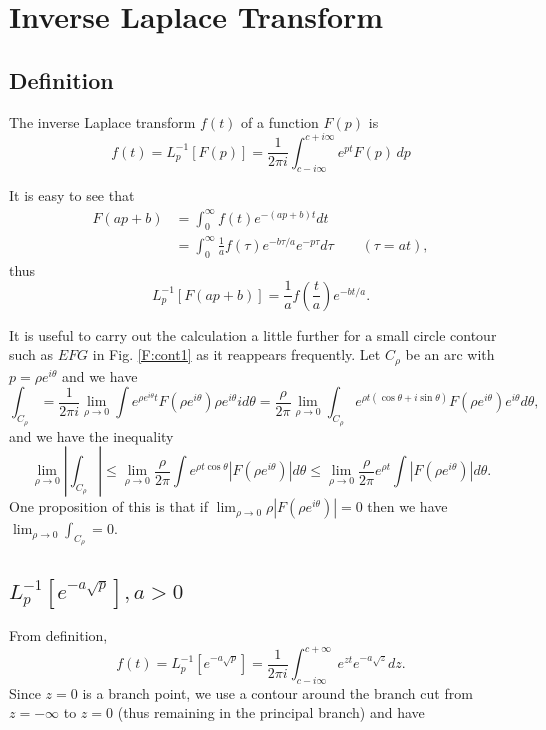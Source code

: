 
\chapter{Inverse Laplace Transform}

\section{Definition}
The inverse Laplace transform $f(t)$ of a function $F(p)$ is
\begin{equation}
	f(t) = L_p^{-1} [ F(p) ] 
       = \frac{1}{2\pi i}   
           \int_{c-i\infty}^{c+i\infty} e^{p t} F(p)\, dp
\end{equation}

It is easy to see that
\begin{align*}
	F(a p+b) 
	&= \int_0^{\infty} f(t) e^{-(a p+b)t} dt  \\
	&= \int_0^{\infty} \frac{1}{a} f\left(\tau\right) e^{-b\tau /a} 
	     e^{-p\tau} d\tau  \qquad (\tau=a t),
\end{align*}
thus
\begin{equation} \label{E:ilt_lin}
	L_p^{-1} [ F(a p + b) ] = \frac{1}{a} f(\frac{t}{a}) e^{-b t/a}.
\end{equation}

It is useful to carry out the calculation a little further for a small circle
contour such as $EFG$ in Fig. \ref{F:cont1} as it reappears frequently. Let
$C_{\rho}$ be an arc with $p=\rho e^{i\theta}$ and we have
\[
  \int_{C_{\rho}}  
    = \frac{1}{2\pi i} \lim_{\rho\to 0} 
      \int e^{\rho e^{i\theta} t} F(\rho e^{i\theta})
        \rho e^{i\theta} i d\theta
    = \frac{\rho}{2\pi} \lim_{\rho\to 0} 
      \int_{C_{\rho}} e^{\rho t (\cos\theta+i\sin\theta)} F(\rho e^{i\theta})
         e^{i\theta} d\theta,
\]
and we have the inequality
\begin{equation}
  \lim_{\rho\to 0} \left| \int_{C_{\rho}} \right| 
    \le \lim_{\rho\to 0} \frac{\rho}{2\pi} 
      \int e^{\rho t \cos\theta} \left| F(\rho e^{i\theta}) \right| d\theta
    \le \lim_{\rho\to 0} \frac{\rho}{2\pi} e^{\rho t} 
        \int \left| F(\rho e^{i\theta}) \right| d\theta.
\end{equation}
One proposition of this is that if 
$\lim_{\rho\to 0} \rho |F(\rho e^{i\theta})|=0$ then we have 
$\lim_{\rho\to 0} \int_{C_{\rho}} =0$.


\section{ $ L_p^{-1} [ e^{-a\sqrt{p}} ], a>0 $ }
From definition, 
\[
	f(t)= L_p^{-1}\left[ e^{-a\sqrt{p}} \right]
	    = \frac{1}{2\pi i} 
			  \int_{c-i\infty}^{c+\infty} 
				e^{zt} e^{-a\sqrt{z}} dz.
\]
Since $z=0$ is a branch point, we use a contour around the branch cut from
$z=-\infty$ to $z=0$ (thus remaining in the principal branch) and have

